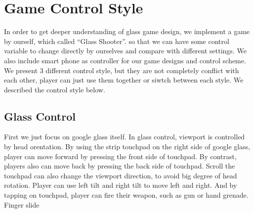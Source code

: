 \documentclass{sigchi}
\begin{document}


\section{Game Control Style}
In order to get deeper understanding of glass game design, we implement a game by ourself, which called ``Glass Shooter''. so that we can have some control variable to change directly by ourselves and compare with different settings. We also include smart phone as controller for our game designs and control scheme. We present 3 different control style, but they are not completely conflict with each other, player can just use them together or siwtch between each style. We described the control style below. 


\subsection{Glass Control}
First we just focus on google glass itself. In glass control, viewport is controlled by head orentation. By using the strip touchpad on the right side of google glass, player can move forward by pressing the front side of touchpad. By contrast, players also can move back by pressing the back side of touchpad. Scroll the touchpad can also change the viewport direction, to avoid big degree of head rotation. Player can use left tilt and right tilt to move left and right. And by tapping on touchpad, player can fire their weapon, such as gun or hand grenade. Finger slide
\end{document}
